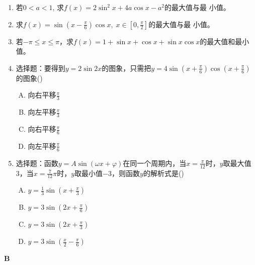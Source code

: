 \begin{enumerate}
\item 若$0<a<1$, 求$f(x)=2\sin^2x+4a\cos x-a^2$的最大值与最
小值。

\item 求$f(x)=\sin\left(x-\frac{\pi}{6}\right)\cos x,\; x\in\left[0,\frac{\pi}{2}\right]$的最大值与最
小值。
\item 若$-\pi\le x\le \pi$，求$f(x)=1+\sin x+\cos x+\sin x\cos x$的最大值和最小值。
\item 选择题：要得到$y=2\sin2x$的图象，只需把$y=4\sin\left(x+\frac{\pi}{6}\right)\cos\left(x+\frac{\pi}{6}\right)$的图象\hfill (\qquad)
\begin{multicols}{2}
\begin{enumerate}[(A)]
    \item 向右平移$\frac{\pi}{3}$
    \item 向左平移$\frac{\pi}{3}$
    \item 向右平移$\frac{\pi}{6}$
    \item 向左平移$\frac{\pi}{6}$
\end{enumerate}
\end{multicols}

\item 选择题：函数$y=A\sin(\omega x+\varphi)$在同一个周期内，当$x=\frac{\pi}{12}$时，$y$取最大值3，当$x=\frac{7}{12}\pi$时，$y$取最小值$-3$，则函数$y$的解析式是\hfill (\qquad)
\begin{multicols}{2}
\begin{enumerate}[(A)]
    \item $y=\frac{1}{3} \sin\left(x+\frac{\pi}{3}\right)$
    \item $y=3 \sin\left(2x+\frac{\pi}{6}\right)$
    \item $y= 3\sin\left(2x+\frac{\pi}{3}\right)$
    \item $y= 3\sin\left(\frac{x}{2}-\frac{\pi}{6}\right)$
\end{enumerate}
\end{multicols}
\end{enumerate}


\begin{center}
    \bfseries B
\end{center}

